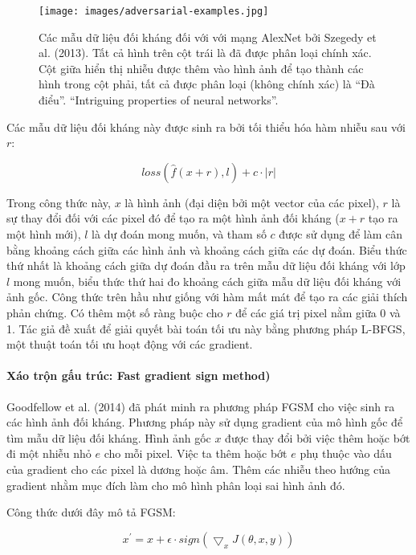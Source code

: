 \begin{figure*}[h!]
	\centering
	\texttt{[image: images/adversarial-examples.jpg]}
	\label{fig:6_3}
	\caption{Các mẫu dữ liệu đối kháng đối với với mạng AlexNet bởi Szegedy et al. (2013). Tất cả hình trên cột trái là đã được phân loại chính xác. Cột giữa hiển thị nhiễu được thêm vào hình ảnh để tạo thành các hình trong cột phải, tất cả được phân loại (không chính xác) là “Đà điểu”. ``Intriguing properties of neural networks''.}
\end{figure*}

Các mẫu dữ liệu đối kháng này được sinh ra bởi tối thiểu hóa hàm nhiễu sau với $r$:

\[loss(\hat{f}(x+r),l)+c\cdot|r|\]

Trong công thức này, $x$ là hình ảnh (đại diện bởi một vector của các pixel), $r$ là sự thay đổi đối với các pixel đó để tạo ra một hình ảnh đối kháng ($x+r$ tạo ra một hình mới), $l$ là dự đoán mong muốn, và tham số $c$ được sử dụng để làm cân bằng khoảng cách giữa các hình ảnh và khoảng cách giữa các dự đoán. Biểu thức thứ nhất là khoảng cách giữa dự đoán đầu ra trên mẫu dữ liệu đối kháng với lớp $l$ mong muốn, biểu thức thứ hai đo khoảng cách giữa mẫu dữ liệu đối kháng với ảnh gốc. Công thức trên hầu như giống với hàm mất mát để tạo ra các giải thích phản chứng. Có thêm một số ràng buộc cho $r$ để các giá trị pixel nằm giữa 0 và 1. Tác giả đề xuất để giải quyết bài toán tối ưu này bằng phương pháp L-BFGS, một thuật toán tối ưu hoạt động với các gradient.

\paragraph{Xáo trộn gấu trúc: Fast gradient sign method)}

Goodfellow et al. (2014) đã phát minh ra phương pháp FGSM cho việc sinh ra các hình ảnh đối kháng. Phương pháp này sử dụng gradient của mô hình gốc để tìm mẫu dữ liệu đối kháng. Hình ảnh gốc $x$ được thay đổi bởi việc thêm hoặc bớt đi một nhiễu nhỏ $e$ cho mỗi pixel. Việc ta thêm hoặc bớt $e$ phụ thuộc vào dấu của gradient cho các pixel là dương hoặc âm. Thêm các nhiễu theo hướng của gradient nhằm mục đích làm cho mô hình phân loại sai hình ảnh đó.

Công thức dưới đây mô tả FGSM:

\[x^\prime=x+\epsilon\cdot{}sign(\bigtriangledown_x{}J(\theta,x,y))\]

